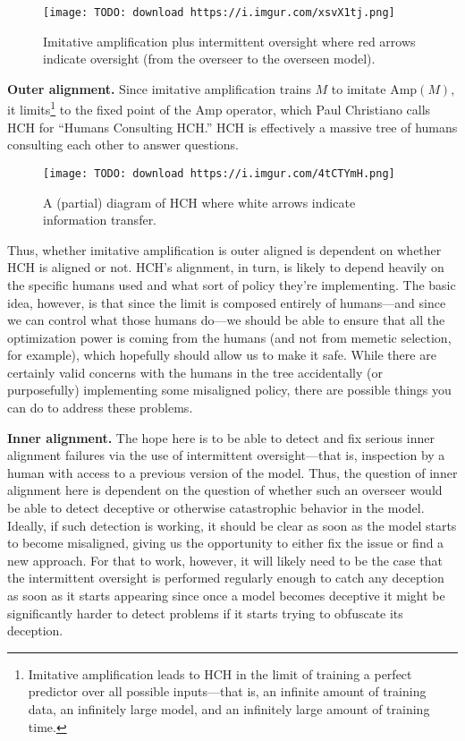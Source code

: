 \documentclass[
  onecolumn,
  natbib,
]{miri-tech-article}
\begin{document}
\begin{figure}[h!]
  \centering
  \texttt{[image: TODO: download https://i.imgur.com/xsvX1tj.png]}
  \caption{Imitative amplification plus intermittent oversight where red arrows indicate oversight (from the overseer to the overseen model).}
\end{figure}

\textbf{Outer alignment.} Since imitative amplification trains $M$ to imitate $\text{Amp}(M)$, it limits\footnote{Imitative amplification leads to HCH in the limit of training a perfect predictor over all possible inputs---that is, an infinite amount of training data, an infinitely large model, and an infinitely large amount of training time.} to the fixed point of the $\text{Amp}$ operator, which Paul Christiano calls HCH\cite{TODO: cite https://ai-alignment.com/strong-hch-bedb0dc08d4e} for ``Humans Consulting HCH.'' HCH is effectively a massive tree of humans consulting each other to answer questions.

\begin{figure}[h!]
  \centering
  \texttt{[image: TODO: download https://i.imgur.com/4tCTYmH.png]}
  \caption{A (partial) diagram of HCH where white arrows indicate information transfer.}
\end{figure}

Thus, whether imitative amplification is outer aligned is dependent on whether HCH is aligned or not. HCH's alignment, in turn, is likely to depend heavily on the specific humans used and what sort of policy they're implementing. The basic idea, however, is that since the limit is composed entirely of humans---and since we can control what those humans do---we should be able to ensure that all the optimization power is coming from the humans (and not from memetic selection, for example), which hopefully should allow us to make it safe. While there are certainly valid concerns with the humans in the tree accidentally (or purposefully) implementing some misaligned policy, there are possible things you can do to address these problems\cite{TODO: cite https://ai-alignment.com/universality-and-consequentialism-within-hch-c0bee00365bd}.

\textbf{Inner alignment.} The hope here is to be able to detect and fix serious inner alignment failures via the use of intermittent oversight---that is, inspection by a human with access to a previous version of the model. Thus, the question of inner alignment here is dependent on the question of whether such an overseer would be able to detect deceptive or otherwise catastrophic behavior in the model. Ideally, if such detection is working, it should be clear as soon as the model starts to become misaligned, giving us the opportunity to either fix the issue or find a new approach. For that to work, however, it will likely need to be the case that the intermittent oversight is performed regularly enough to catch any deception as soon as it starts appearing since once a model becomes deceptive it might be significantly harder to detect problems if it starts trying to obfuscate its deception.
\end{document}
